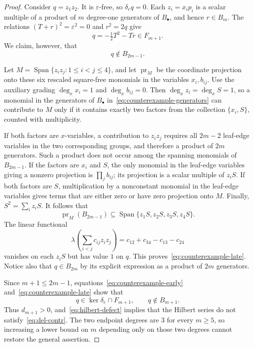\documentclass[reqno]{article}
\theoremstyle{plain} %
\theoremstyle{definition}
\theoremstyle{remark}
\DeclareMathOperator{\Span}{Span}
\numberwithin{equation}{section}
\begin{document}
\begin{proof}
Consider $q=z_1z_2$.  It is $\varepsilon$-free, so $\delta_eq=0$.
Each $z_i=x_ip_i$ is a scalar multiple of a product of $m$ degree-one
generators of $B_\bullet$, and hence $r\in B_m$.
The relations $(T+r)^2=\varepsilon^2=0$ and $r^2=2q$ give
\begin{equation}\label{eq:counterexample-early}
q=-\tfrac12T^2-Tr\in F_{m+1}.
\end{equation}
We claim, however, that
\begin{equation}\label{eq:counterexample-late}
q\notin B_{2m-1}.
\end{equation}

Let $M=\Span\{z_i z_j:1\le i<j\le4\}$, and let
$\operatorname{pr}_M$ be the coordinate projection onto these six
rescaled square-free monomials in the variables $x_i,b_{ij}$.
Use the auxiliary grading $\deg_x x_i=1$ and $\deg_x b_{ij}=0$.
Then $\deg_x z_i=\deg_x S=1$, so a monomial in the generators of
$B_\bullet$ in~\eqref{eq:counterexample-generators} can contribute to
$M$ only if it contains exactly two factors from the collection
$\{x_i,S\}$, counted with multiplicity.

If both factors are $x$-variables, a contribution to $z_i z_j$
requires all $2m-2$ leaf-edge variables in the two corresponding groups,
and therefore a product of $2m$ generators.  Such a product does not
occur among the spanning monomials of $B_{2m-1}$.
If the factors are $x_i$ and $S$, the only monomial in the leaf-edge
variables giving a nonzero projection is $\prod_jb_{ij}$; its
projection is a scalar multiple of $z_iS$. If both factors are $S$,
multiplication by a nonconstant monomial in the leaf-edge variables
gives terms that are either zero or have zero projection onto $M$.
Finally, $S^2=\sum_i z_iS$.  It follows that
\[
\operatorname{pr}_M(B_{2m-1})
\subseteq\Span\{z_1S,z_2S,z_3S,z_4S\}.
\]
The linear functional
\[
\lambda\left(\sum_{i<j}c_{ij}z_i z_j\right)
=c_{12}+c_{34}-c_{13}-c_{24}
\]
vanishes on each $z_iS$ but has value $1$ on $q$.
This proves~\eqref{eq:counterexample-late}.
Notice also that $q\in B_{2m}$ by its explicit expression as a product
of $2m$ generators.

Since $m+1\le2m-1$, equations~\eqref{eq:counterexample-early}
and~\eqref{eq:counterexample-late} show that
\[
q\in\ker\delta_e\cap F_{m+1},\qquad q\notin B_{m+1}.
\]
Thus $d_{m+1}>0$, and~\eqref{eq:hilbert-defect} implies that the
Hilbert series do not satisfy~\eqref{eq:del-contr}.
The two endpoint degrees are $3$ for every $m\ge5$, so increasing a
lower bound on $m$ depending only on those two degrees cannot restore
the general assertion.
\end{proof}
\end{document}
